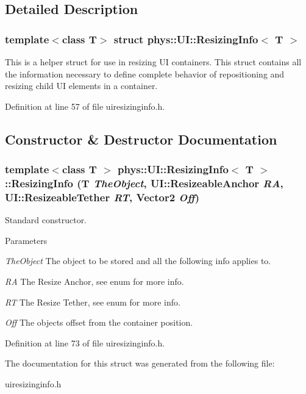 \subsection{Detailed Description}
\subsubsection*{template$<$class T$>$ struct phys::UI::ResizingInfo$<$ T $>$}

This is a helper struct for use in resizing UI containers. This struct contains all the information necessary to define complete behavior of repositioning and resizing child UI elements in a container. 

Definition at line 57 of file uiresizinginfo.h.



\subsection{Constructor \& Destructor Documentation}
\hypertarget{structphys_1_1UI_1_1ResizingInfo_a38e0e636eaa33da1516d29d5dacad5b7}{
\subsubsection[{ResizingInfo}]{\setlength{\rightskip}{0pt plus 5cm}template$<$class T $>$ {\bf phys::UI::ResizingInfo}$<$ T $>$::{\bf ResizingInfo} (T {\em TheObject}, \/  UI::ResizeableAnchor {\em RA}, \/  UI::ResizeableTether {\em RT}, \/  {\bf Vector2} {\em Off})}}
\label{d0/d08/structphys_1_1UI_1_1ResizingInfo_a38e0e636eaa33da1516d29d5dacad5b7}


Standard constructor. 


\begin{DoxyParams}{Parameters}
\item[{\em TheObject}]The object to be stored and all the following info applies to. \item[{\em RA}]The Resize Anchor, see enum for more info. \item[{\em RT}]The Resize Tether, see enum for more info. \item[{\em Off}]The objects offset from the container position. \end{DoxyParams}


Definition at line 73 of file uiresizinginfo.h.



The documentation for this struct was generated from the following file:\begin{DoxyCompactItemize}
\item 
uiresizinginfo.h\end{DoxyCompactItemize}
